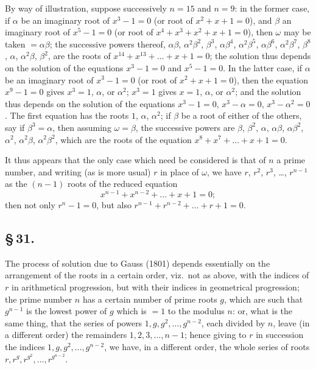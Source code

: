 \documentclass[11pt,a4paper]{book}
\begin{document}
By way of illustration, suppose successively $n = 15$ and $n = 9$: in the former case, if $\alpha$ be an imaginary root of $x^{3} - 1 = 0$ (or root of $x^{2} + x + 1 = 0$), and $\beta$ an imaginary root of $x^{5} - 1 = 0$ (or root of $x^{4} + x^{3} + x^{2} + x + 1 = 0$), then $\omega$ may be taken $= \alpha\beta$; the successive powers thereof, $\alpha\beta$, $\alpha^{2}\beta^{2}$, $\beta^{3}$, $\alpha\beta^{4}$, $\alpha^{2}\beta^{5}$, $\alpha\beta^{6}$, $\alpha^{2}\beta^{7}$, $\beta^{8}$, $\alpha$, $\alpha^{2}\beta$, $\beta^{2}$, are the roots of $x^{14} + x^{13} + \ldots + x + 1 = 0$; the solution thus depends on the solution of the equations $x^{3} - 1 = 0$ and $x^{5} - 1 = 0$. In the latter case, if $\alpha$ be an imaginary root of $x^{3} - 1 = 0$ (or root of $x^{2} + x + 1 = 0$), then the equation $x^{9} - 1 = 0$ gives $x^{3} = 1$, $\alpha$, or $\alpha^{2}$; $x^{3} = 1$ gives $x = 1$, $\alpha$, or $\alpha^{2}$; and the solution thus depends on the solution of the equations $x^{3} - 1 = 0$, $x^{3} - \alpha = 0$, $x^{3} - \alpha^{2} = 0$. The first equation has the roots $1$, $\alpha$, $\alpha^{2}$; if $\beta$ be a root of either of the others, say if $\beta^{3} = \alpha$, then assuming $\omega = \beta$, the successive powers are $\beta$, $\beta^{2}$, $\alpha$, $\alpha\beta$, $\alpha\beta^{2}$, $\alpha^{2}$, $\alpha^{2}\beta$, $\alpha^{2}\beta^{2}$, which are the roots of the equation $x^{8} + x^{7} + \ldots + x + 1 = 0$.

It thus appears that the only case which need be considered is that of $n$ a prime number, and writing (as is more usual) $r$ in place of $\omega$, we have $r$, $r^{2}$, $r^{3}$, \ldots, $r^{n-1}$ as the $(n - 1)$ roots of the reduced equation
\[
x^{n-1} + x^{n-2} + \ldots + x + 1 = 0;
\]
then not only $r^{n} - 1 = 0$, but also $r^{n-1} + r^{n-2} + \ldots + r + 1 = 0$.

\subsection*{\S\,31.}

The process of solution due to Gauss (1801) depends essentially on the arrangement of the roots in a certain order, viz.\ not as above, with the indices of $r$ in arithmetical progression, but with their indices in geometrical progression; the prime number $n$ has a certain number of prime roots $g$, which are such that $g^{n-1}$ is the lowest power of $g$ which is $= 1$ to the modulus $n$: or, what is the same thing, that the series of powers $1, g, g^{2}, \ldots, g^{n-2}$, each divided by $n$, leave (in a different order) the remainders $1, 2, 3, \ldots, n - 1$; hence giving to $r$ in succession the indices $1, g, g^{2}, \ldots, g^{n-2}$, we have, in a different order, the whole series of roots $r, r^{g}, r^{g^{2}}, \ldots, r^{g^{n-2}}$.
\end{document}
